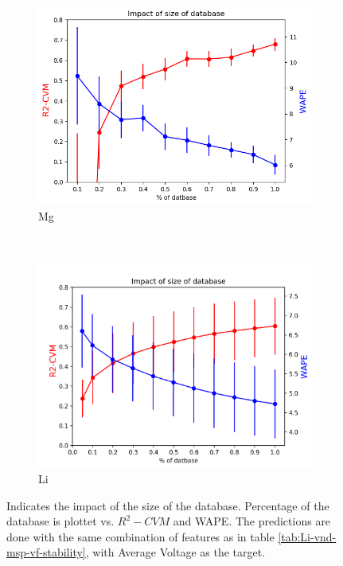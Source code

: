 \begin{figure}[h]
    \centering
        \begin{subfigure}{0.45\textwidth}
        \centering
        \includegraphics[width=\linewidth]{result/figures/Mg_size_db-2.png}
        \caption{Mg}
        \label{fig:Mg_size_db}
    \end{subfigure}
    ~ 
        \begin{subfigure}{0.45\textwidth}
        \centering
        \includegraphics[width=\linewidth]{result/figures/Li_size_db-2.png}
        \caption{Li}
        \label{fig:Li_size_db}
    \end{subfigure}
	\caption{Indicates the impact of the size of the database. Percentage of the database is plottet vs. $R^2-CVM$ and WAPE. The predictions are done with the same combination of features as in table \ref{tab:Li-vnd-msp-vf-stability}, with Average Voltage as the target.}
	\label{fig:trees_size}
\end{figure}


